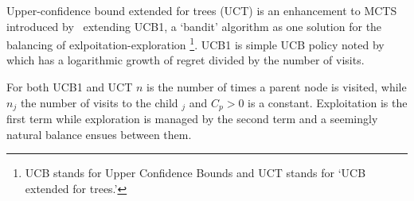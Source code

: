 \documentclass[letterpaper]{article}
\begin{document}
Upper-confidence bound extended for trees (UCT) is an enhancement to MCTS introduced by~\cite{kocsis2006improved} extending UCB1, a `bandit' algorithm as one solution for the balancing of exlpoitation-exploration \footnote{UCB stands for Upper Confidence Bounds and UCT stands for `UCB extended for trees.'}. UCB1 is simple UCB policy noted by~\cite{auer2002finite} which has a logarithmic growth of regret divided by the number of visits.


For both UCB1 and UCT $n$ is the number of times a parent node is visited, while $n_j$ the number of visits to the child $_j$ and $C_p > 0$ is a constant. Exploitation is the first term while exploration is managed by the second term and a seemingly natural balance ensues between them. 

%
\end{document}
